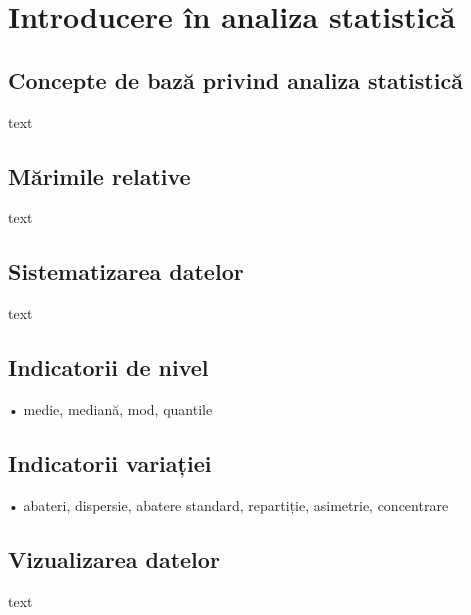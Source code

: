 \documentclass[
  11pt,
  b5paper,
  nottoc]{book}
\begin{document}

\hypertarget{cap3}{%
\chapter{Introducere în analiza statistică}\label{cap3}}

\hypertarget{concepte-de-bazux103-privind-analiza-statisticux103}{%
\section{Concepte de bază privind analiza
statistică}\label{concepte-de-bazux103-privind-analiza-statisticux103}}

text

\hypertarget{mux103rimile-relative}{%
\section{Mărimile relative}\label{mux103rimile-relative}}

text

\hypertarget{sistematizarea-datelor}{%
\section{Sistematizarea datelor}\label{sistematizarea-datelor}}

text

\hypertarget{indicatorii-de-nivel}{%
\section{Indicatorii de nivel}\label{indicatorii-de-nivel}}

• medie, mediană, mod, quantile

\hypertarget{indicatorii-variaux21biei}{%
\section{Indicatorii variației}\label{indicatorii-variaux21biei}}

• abateri, dispersie, abatere standard, repartiție, asimetrie,
concentrare

\hypertarget{vizualizarea-datelor}{%
\section{Vizualizarea datelor}\label{vizualizarea-datelor}}

text
\end{document}
